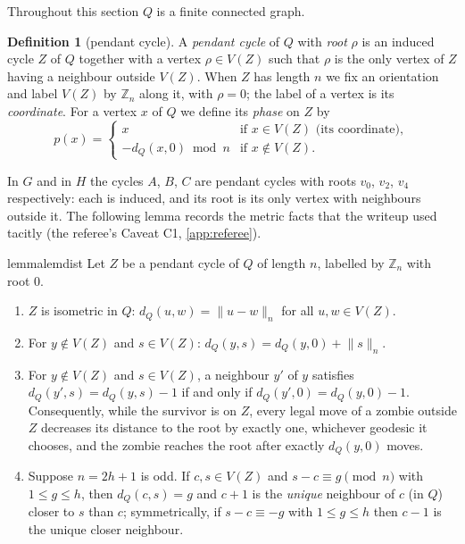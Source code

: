 \documentclass[11pt,a4paper]{article}
\theoremstyle{plain}
\theoremstyle{definition}
\newtheorem{definition}[theorem]{Definition}
\theoremstyle{remark}
\providecommand{\tightlist}{\setlength{\itemsep}{0pt}\setlength{\parskip}{0pt}}
\newcommand{\Z}{\mathbb Z}
\newcommand{\cyc}[2]{\lVert #1\rVert_{#2}}
\newcommand{\dist}{d}
\begin{document}
Throughout this section $Q$ is a finite connected graph.

\begin{definition}[pendant cycle]\label{def:pendant}
A \emph{pendant cycle} of $Q$ with \emph{root} $\rho$ is an induced cycle $Z$ of $Q$ together with a vertex $\rho\in V(Z)$ such that $\rho$ is the only vertex of $Z$ having a neighbour outside $V(Z)$. When $Z$ has length $n$ we fix an orientation and label $V(Z)$ by $\Z_n$ along it, with $\rho=0$; the label of a vertex is its \emph{coordinate}. For a vertex $x$ of $Q$ we define its \emph{phase} on $Z$ by
\[
p(x)=\begin{cases} x & \text{if } x\in V(Z) \text{ (its coordinate)},\\ -\dist_Q(x,0) \bmod n & \text{if } x\notin V(Z).\end{cases}
\]
\end{definition}

In $G$ and in $H$ the cycles $A$, $B$, $C$ are pendant cycles with roots $v_0$, $v_2$, $v_4$ respectively: each is induced, and its root is its only vertex with neighbours outside it. The following lemma records the metric facts that the writeup used tacitly (the referee's Caveat C1, \cref{app:referee}).

\begin{restatable}{lemma}{lemdist}\label{lem:dist}
Let $Z$ be a pendant cycle of $Q$ of length $n$, labelled by $\Z_n$ with root $0$.
\begin{enumerate}[label=(\alph*)]\tightlist
\item $Z$ is isometric in $Q$: $\dist_Q(u,w)=\cyc{u-w}{n}$ for all $u,w\in V(Z)$.
\item For $y\notin V(Z)$ and $s\in V(Z)$: $\dist_Q(y,s)=\dist_Q(y,0)+\cyc{s}{n}$.
\item For $y\notin V(Z)$ and $s\in V(Z)$, a neighbour $y'$ of $y$ satisfies $\dist_Q(y',s)=\dist_Q(y,s)-1$ if and only if $\dist_Q(y',0)=\dist_Q(y,0)-1$. Consequently, while the survivor is on $Z$, every legal move of a zombie outside $Z$ decreases its distance to the root by exactly one, whichever geodesic it chooses, and the zombie reaches the root after exactly $\dist_Q(y,0)$ moves.
\item Suppose $n=2h+1$ is odd. If $c,s\in V(Z)$ and $s-c\equiv g\pmod n$ with $1\le g\le h$, then $\dist_Q(c,s)=g$ and $c+1$ is the \emph{unique} neighbour of $c$ (in $Q$) closer to $s$ than $c$; symmetrically, if $s-c\equiv-g$ with $1\le g\le h$ then $c-1$ is the unique closer neighbour.
\end{enumerate}
\end{restatable}
\end{document}
